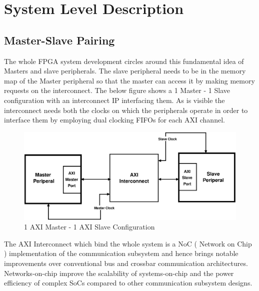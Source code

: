 \chapter{System Level Description}

\section{Master-Slave Pairing}

The whole FPGA system development circles around this fundamental idea of Masters and slave peripherals. The slave peripheral needs to be in
the memory map of the Master peripheral so that the master can access it by making memory requests on the interconnect. The below figure
shows a 1 Master - 1 Slave configuration with an interconnect IP interfacing them. As is visible the interconnect needs both the clocks on which
the peripherals operate in order to interface them by employing dual clocking FIFOs for each AXI channel.

\begin{figure}[H]
\centering
\includegraphics[width=\textwidth]{eps_pdf_sources/ajit_fpga/System_Level/One_Master_One_Slave}
\caption{1 AXI Master - 1 AXI Slave Configuration}
\end{figure}

The AXI Interconnect which bind the whole system is a NoC ( Network on Chip ) implementation of the communication subsystem and hence brings
notable improvements over conventional bus and crossbar communication architectures. Networks-on-chip improve the scalability of
systems-on-chip and the power efficiency of complex SoCs compared to other communication subsystem designs. 

